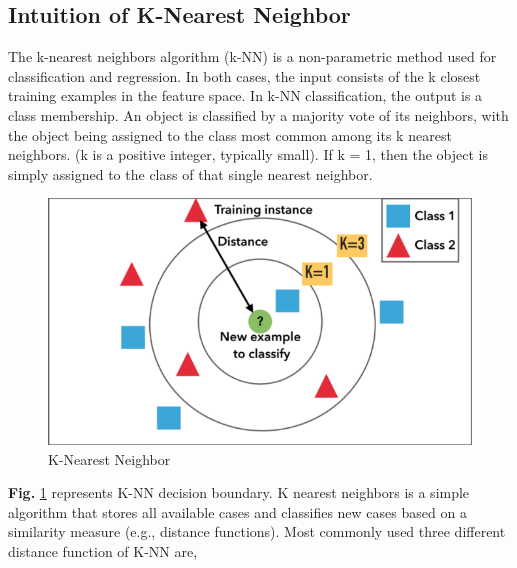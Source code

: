 \subsection{Intuition of K-Nearest Neighbor}
The k-nearest neighbors algorithm (k-NN) is a non-parametric method used for classification and regression. In both cases, the input consists of the k closest training examples in the feature space. In k-NN classification, the output is a class membership. An object is classified by a majority vote of its neighbors, with the object being assigned to the class most common among its k nearest neighbors. (k is a positive integer, typically small). If k = 1, then the object is simply assigned to the class of that single nearest neighbor.
\begin{figure}[h!]
    \centering
    \includegraphics[scale=0.35]{Figures/knn.png}
    \caption{K-Nearest Neighbor}
    \label{fig:knn}
\end{figure}
\par
\noindent
\textbf{Fig.} \ref{fig:knn} represents K-NN decision boundary. K nearest neighbors is a simple algorithm that stores all available cases and classifies new cases based on a similarity measure (e.g., distance functions). Most commonly used three different distance function of K-NN are,


